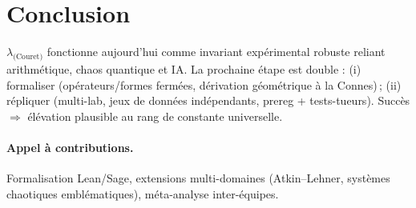 \documentclass[11pt,a4paper]{article}
\def\lambda{λ}%
\def\textbf#1{#1}%
\def\emph#1{#1}%
\begin{document}
\section{Conclusion}
$\lambda_{\text{(Couret)}}$ fonctionne aujourd’hui comme \emph{invariant expérimental robuste}
reliant arithmétique, chaos quantique et IA.
La prochaine étape est double : (i) \textbf{formaliser} (opérateurs/formes fermées, dérivation géométrique à la Connes)\,; (ii) \textbf{répliquer} (multi-lab, jeux de données indépendants, prereg + tests-tueurs). Succès $\Rightarrow$ élévation plausible au rang de \emph{constante universelle}.

\paragraph{Appel à contributions.}
Formalisation Lean/Sage, extensions multi-domaines (Atkin–Lehner, systèmes chaotiques emblématiques), méta-analyse inter-équipes.

\printbibliography
{} %
\end{document}
